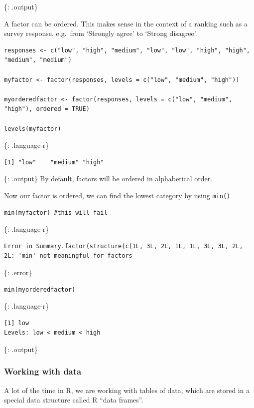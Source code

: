 \documentclass[]{article}
\begin{document}
\{: .output\}

A factor can be ordered. This makes sense in the context of a ranking
such as a survey response, e.g.~from `Strongly agree' to `Strong
disagree'.

\begin{verbatim}
responses <- c("low", "high", "medium", "low", "low", "high", "high", "medium", "medium")

myfactor <- factor(responses, levels = c("low", "medium", "high"))

myorderedfactor <- factor(responses, levels = c("low", "medium", "high"), ordered = TRUE)

levels(myfactor)
\end{verbatim}

\{: .language-r\}

\begin{verbatim}
[1] "low"    "medium" "high"  
\end{verbatim}

\{: .output\} By default, factors will be ordered in alphabetical order.

Now our factor is ordered, we can find the lowest category by using
\texttt{min()}

\begin{verbatim}
min(myfactor) #this will fail
\end{verbatim}

\{: .language-r\}

\begin{verbatim}
Error in Summary.factor(structure(c(1L, 3L, 2L, 1L, 1L, 3L, 3L, 2L, 2L: 'min' not meaningful for factors
\end{verbatim}

\{: .error\}

\begin{verbatim}
min(myorderedfactor)
\end{verbatim}

\{: .language-r\}

\begin{verbatim}
[1] low
Levels: low < medium < high
\end{verbatim}

\{: .output\}

\subsubsection{Working with data}\label{working-with-data}

A lot of the time in R, we are working with tables of data, which are
stored in a special data structure called R ``data frames''.
\end{document}
